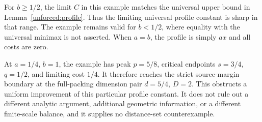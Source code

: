 For \(b\ge1/2\), the limit \(C\) in this example matches the universal
upper bound in Lemma~\ref{unforced:profile}. Thus the limiting universal
profile constant is sharp in that range. The example remains valid for
\(b<1/2\), where equality with the universal minimax is not asserted.
When \(a=b\), the profile is simply \(ax\) and all costs are zero.

At \(a=1/4\), \(b=1\), the example has peak \(p=5/8\), critical
endpoints \(s=3/4\), \(q=1/2\), and limiting cost \(1/4\). It
therefore reaches the strict source-margin boundary at the full-packing
dimension pair \(d=5/4\), \(D=2\). This obstructs a uniform improvement
of this particular profile constant. It does not rule out a different
analytic argument, additional geometric information, or a different
finite-scale balance, and it supplies no distance-set counterexample.
